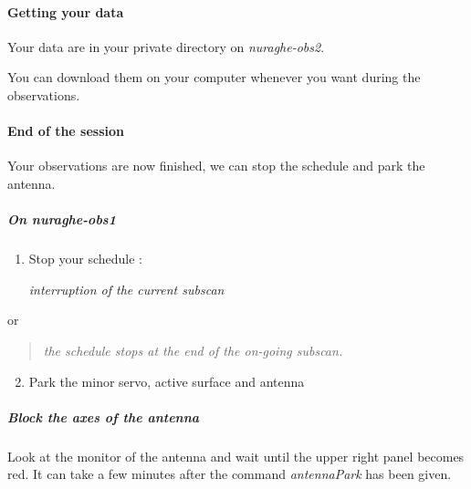 \documentclass[letterpaper,10pt,english]{sphinxmanual}
\begin{document}
\paragraph{Getting your data}
\label{Continuum/C-band/TP/get-data:getting-your-data}\label{Continuum/C-band/TP/get-data::doc}
Your data are in your private directory on \emph{nuraghe-obs2}.

You can download them on your computer whenever you want during the observations.
\begin{quote}

\end{quote}


\paragraph{End of the session}
\label{Continuum/C-band/TP/stop-session:end-of-the-session}\label{Continuum/C-band/TP/stop-session::doc}
Your observations are now finished, we can stop the schedule and park
the antenna.


\subparagraph{On nuraghe-obs1}
\label{Continuum/C-band/TP/stop-session:on-nuraghe-obs1}\begin{enumerate}
\item {} 
Stop your schedule :

   \emph{interruption of the current subscan}

\end{enumerate}

or
\begin{quote}

    \emph{the schedule stops at the end of the on-going subscan.}
\end{quote}
\begin{enumerate}
\setcounter{enumi}{1}
\item {} 
Park the minor servo, active surface and antenna





\end{enumerate}


\subparagraph{Block the axes of the antenna}
\label{Continuum/C-band/TP/stop-session:block-the-axes-of-the-antenna}
Look at the monitor of the antenna and wait until the upper right
panel becomes red. It can take a few minutes after the command
\emph{antennaPark} has been given.
\end{document}
